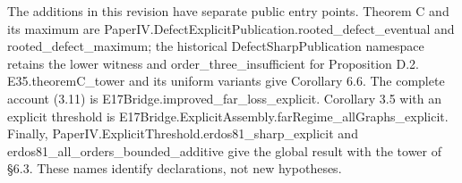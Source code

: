 \documentclass[english,11pt,a4paper]{article}
\begin{document}
The additions in this revision have separate public entry points. Theorem C and its maximum are {\ttfamily\small PaperIV.\discretionary{\hbox{\ensuremath{\hookrightarrow}}}{}{}DefectExplic\discretionary{\hbox{\ensuremath{\hookrightarrow}}}{}{}itPublicatio\discretionary{\hbox{\ensuremath{\hookrightarrow}}}{}{}n.\discretionary{\hbox{\ensuremath{\hookrightarrow}}}{}{}rooted\_\discretionary{\hbox{\ensuremath{\hookrightarrow}}}{}{}defect\_\discretionary{\hbox{\ensuremath{\hookrightarrow}}}{}{}eventual} and {\ttfamily\small rooted\_\discretionary{\hbox{\ensuremath{\hookrightarrow}}}{}{}defect\_\discretionary{\hbox{\ensuremath{\hookrightarrow}}}{}{}maximum}; the historical {\ttfamily\small DefectSharpP\discretionary{\hbox{\ensuremath{\hookrightarrow}}}{}{}ublication} namespace retains the lower witness and {\ttfamily\small order\_\discretionary{\hbox{\ensuremath{\hookrightarrow}}}{}{}three\_\discretionary{\hbox{\ensuremath{\hookrightarrow}}}{}{}insufficient} for Proposition D.2. {\ttfamily\small E35.\discretionary{\hbox{\ensuremath{\hookrightarrow}}}{}{}theoremC\_\discretionary{\hbox{\ensuremath{\hookrightarrow}}}{}{}tower} and its uniform variants give Corollary 6.6. The complete account (3.11) is {\ttfamily\small E17Bridge.\discretionary{\hbox{\ensuremath{\hookrightarrow}}}{}{}improved\_\discretionary{\hbox{\ensuremath{\hookrightarrow}}}{}{}far\_\discretionary{\hbox{\ensuremath{\hookrightarrow}}}{}{}loss\_\discretionary{\hbox{\ensuremath{\hookrightarrow}}}{}{}explicit}. Corollary 3.5 with an explicit threshold is {\ttfamily\small E17Bridge.\discretionary{\hbox{\ensuremath{\hookrightarrow}}}{}{}ExplicitAsse\discretionary{\hbox{\ensuremath{\hookrightarrow}}}{}{}mbly.\discretionary{\hbox{\ensuremath{\hookrightarrow}}}{}{}farRegime\_\discretionary{\hbox{\ensuremath{\hookrightarrow}}}{}{}allGraphs\_\discretionary{\hbox{\ensuremath{\hookrightarrow}}}{}{}explicit}. Finally, {\ttfamily\small PaperIV.\discretionary{\hbox{\ensuremath{\hookrightarrow}}}{}{}ExplicitThre\discretionary{\hbox{\ensuremath{\hookrightarrow}}}{}{}shold.\discretionary{\hbox{\ensuremath{\hookrightarrow}}}{}{}erdos81\_\discretionary{\hbox{\ensuremath{\hookrightarrow}}}{}{}sharp\_\discretionary{\hbox{\ensuremath{\hookrightarrow}}}{}{}explicit} and {\ttfamily\small erdos81\_\discretionary{\hbox{\ensuremath{\hookrightarrow}}}{}{}all\_\discretionary{\hbox{\ensuremath{\hookrightarrow}}}{}{}orders\_\discretionary{\hbox{\ensuremath{\hookrightarrow}}}{}{}bounded\_\discretionary{\hbox{\ensuremath{\hookrightarrow}}}{}{}additive} give the global result with the tower of §6.3. These names identify declarations, not new hypotheses.
\end{document}
